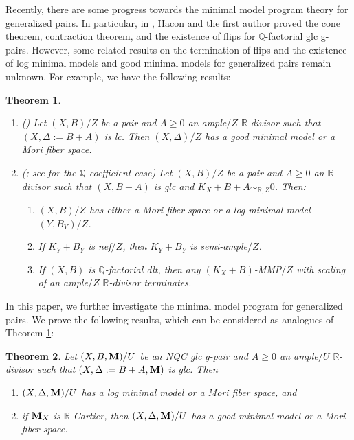 \documentclass[11pt]{amsart}
\numberwithin{equation}{section}
\newcommand{\Mm}{{\bf{M}}}
\newcommand{\Qq}{\mathbb{Q}}
\newcommand{\Rr}{\mathbb{R}}
\newtheorem{thm}{Theorem}[section]
\theoremstyle{definition}
\theoremstyle{definition}
\theoremstyle{definition}
\begin{document}
Recently, there are some progress towards the minimal model program theory for generalized pairs. In particular, in \cite{HL21}, Hacon and the first author proved the cone theorem, contraction theorem, and the existence of flips for $\Qq$-factorial glc g-pairs. However, some related results on the termination of flips and the existence of log minimal models and good minimal models for generalized pairs remain unknown. For example, we have the following results:
\begin{thm}\label{thm: hh20 1.5 and has19 1.1}
\begin{enumerate}
    \item (\cite[Theorem 1.5]{HH20}) Let $(X,B)/Z$ be a pair and $A\geq 0$ an ample$/Z$ $\Rr$-divisor such that $(X,\Delta:=B+A)$ is lc. Then $(X,\Delta)/Z$ has a good minimal model or a Mori fiber space.
    \item (\cite[Theorem 1.1]{Has19}; see \cite{Bir12,HX13} for the $\Qq$-coefficient case) Let $(X,B)/Z$ be a pair and $A\geq 0$ an $\Rr$-divisor such that $(X,B+A)$ is glc and $K_X+B+A\sim_{\Rr,Z}0$. Then:
    \begin{enumerate}
        \item $(X,B)/Z$ has either a Mori fiber space or a log minimal model $(Y,B_Y)/Z$.
        \item If $K_Y+B_Y$ is nef$/Z$, then $K_Y+B_Y$ is semi-ample$/Z$.
        \item If $(X,B)$ is $\Qq$-factorial dlt, then any $(K_X+B)$-MMP$/Z$ with scaling of an ample$/Z$ $\Rr$-divisor terminates.
    \end{enumerate}
\end{enumerate}
\end{thm}

In this paper, we further investigate the minimal model program for generalized pairs. We prove the following results, which can be considered as analogues of Theorem \ref{thm: hh20 1.5 and has19 1.1}:

\begin{thm}\label{thm: has22 3.17 rel ver intro}
Let $(X,B,\Mm)/U$ be an NQC glc g-pair and $A\geq 0$ an ample$/U$ $\Rr$-divisor such that $(X,\Delta:=B+A,\Mm)$ is glc. Then
\begin{enumerate}
    \item $(X,\Delta,\Mm)/U$ has a log minimal model or a Mori fiber space, and
    \item if $\Mm_X$ is $\Rr$-Cartier, then  $(X,\Delta,\Mm)/U$ has a good minimal model or a Mori fiber space.
\end{enumerate}
\end{thm}
\end{document}
